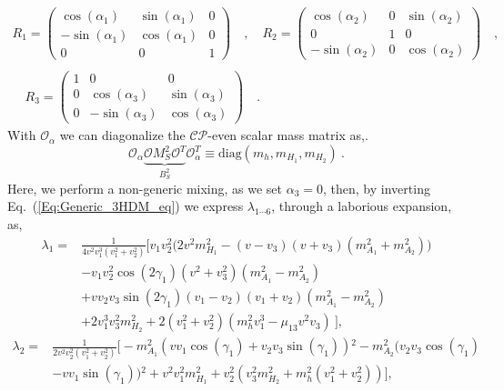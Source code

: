 \documentclass[10pt]{report}
\begin{document}
\begin{gather}
R_1 = \begin{pmatrix}
\cos(\alpha_1) & \sin(\alpha_1) & 0 \\
-\sin(\alpha_1) & \cos(\alpha_1) & 0 \\ 
0 & 0 & 1 
\end{pmatrix} \quad , \quad R_2 = \begin{pmatrix}
\cos(\alpha_2) & 0 & \sin(\alpha_2) \\ 
0 & 1 & 0 \\
-\sin(\alpha_2) & 0 & \cos(\alpha_2) 
\end{pmatrix} \quad ,\\ \\ \quad R_3 = \begin{pmatrix}
1 & 0 & 0 \\
0 & \cos(\alpha_3 ) & \sin(\alpha_3) \\
0 & -\sin(\alpha_3) & \cos(\alpha_3) 
\end{pmatrix} \quad . 
\end{gather}
With $\mathcal{O}_\alpha$ we can diagonalize the $\mathcal{CP}$-even scalar mass matrix as,. 
\begin{equation}
\label{Eq:Generic_3HDM_eq}
\mathcal{O}_\alpha \underbrace{\mathcal{O} M^2_S \mathcal{O}^T }_{B_S^2} \mathcal{O}_\alpha^T \equiv \text{diag}(m_h,m_{H_1},m_{H_2}) \ . 
\end{equation}
Here, we perform a non-generic mixing, as we set $\alpha_3=0$, then, by inverting Eq.~(\ref{Eq:Generic_3HDM_eq}) we express $\lambda_{1\cdots6}$, through a laborious expansion, as, 
\begin{equation}
\begin{split}
\lambda_1 = & \frac{1}{4 v^2 v_1^3 \left(v_1^2+v_2^2\right)} \Bigg[ v_1 v_2^2 \Big(2 v^2 m_{H_1}^2-(v-v_3) (v+v_3) \left(m_{A_1}^2+m_{A_2}^2\right)\Big) \\ & - v_1 v_2^2 \cos \left(2 \gamma _1\right) \left(v^2+v_3^2\right) \left(m_{A_1}^2-m_{A_2}^2\right) \\ &  +v v_2 v_3 \sin \left(2 \gamma _1\right) (v_1-v_2) (v_1+v_2) \left(m_{A_1}^2-m_{A_2}^2\right) \\ &  +2 v_1^3 v_3^2 m_{H_2}^2+2 \left(v_1^2+v_2^2\right) \left(m_h^2 v_1^3-\mu_{13} v^2 v_3\right) \  \Bigg],
\end{split} 
\end{equation}
%
\begin{equation}
\begin{split}
 \lambda_2 = &  \frac{1}{2 v^2 v_2^2 \left(v_1^2+v_2^2\right)} \Bigg[ -m_{A_1}^2 \left(v v_1 \cos \left(\gamma _1\right)+v_2 v_3 \sin \left(\gamma _1\right)\right){}^2  -m_{A_2}^2 \Big(v_2 v_3 \cos \left(\gamma _1\right) \\ & -v v_1 \sin \left(\gamma _1\right)\Big){}^2+v^2 v_1^2 m_{H_1}^2+v_2^2 \left(v_3^2 m_{H_2}^2+m_h^2 \left(v_1^2+v_2^2\right)\right) \Bigg],
\end{split}  
\end{equation}
\end{document}
